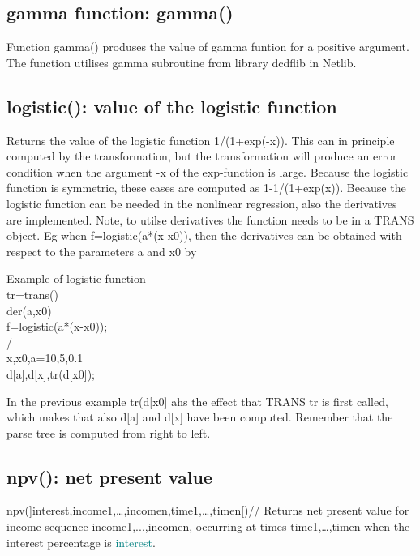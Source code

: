 \begin{itemize}
\subsection{gamma function: \textcolor{VioletRed}{gamma}()}
\label{gamma}
Function \textcolor{VioletRed}{gamma}() produses the value of gamma funtion for a positive argument.
The function utilises gamma subroutine from
library dcdflib in Netlib.
\subsection{\textcolor{VioletRed}{logistic}(): value of the logistic function}
\label{logistic}
Returns the value of the logistic function 1/(1+\textcolor{VioletRed}{exp}(-x)). This can in principle computed by the
transformation, but the transformation will produce an error condition when the argument -x
of the exp-function is large. Because the logistic function is symmetric, these cases are
computed as 1-1/(1+\textcolor{VioletRed}{exp}(x)). Because the logistic function can be needed in the nonlinear
regression, also the derivatives are implemented.  Note, to utilse derivatives
the function needs to be in a TRANS object.
Eg when f=\textcolor{VioletRed}{logistic}(a*(x-x0)), then
the derivatives can be obtained with respect to the parameters a and x0 by
\begin{example}[logisticex]Example of logistic function\\
\label{logisticex}
tr=\textcolor{VioletRed}{trans}()\\
\textcolor{VioletRed}{der}(a,x0)\\
f=\textcolor{VioletRed}{logistic}(a*(x-x0));\\
/\\
x,x0,a=10,5,0.1\\
d[a],d[x],tr(d[x0]);
\end{example}
\begin{note}
In the previous example tr(d[x0] ahs the effect that TRANS tr is first
called, which makes that also d[a] and d[x] have been computed. Remember that
the parse tree is computed from right to left.
\end{note}
\subsection{\textcolor{VioletRed}{npv}(): net present value}
\label{npv}

\textcolor{VioletRed}{npv}(]interest,income1,…,incomen,time1,…,timen[)//
Returns net present value for income sequence income1,...,incomen, occurring at times
time1,…,timen when the interest percentage is \textcolor{teal}{interest}.

\end{itemize}
